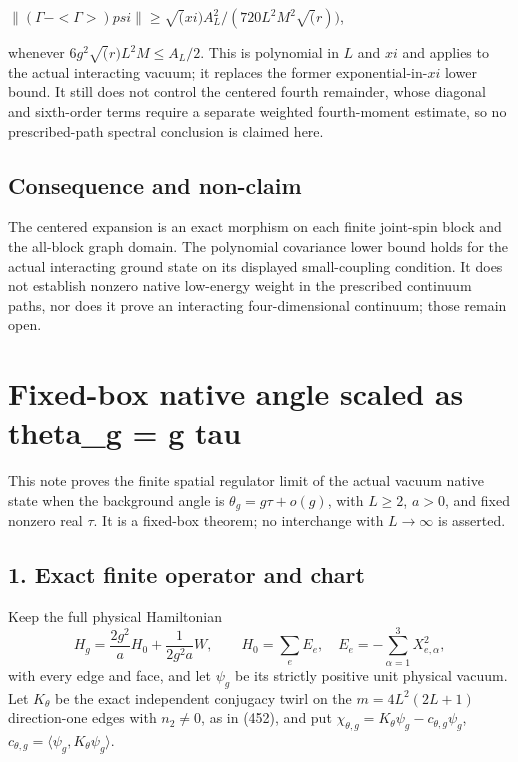 \documentclass[
  11pt,
]{article}
\begin{document}
\(\| (\Gamma-<\Gamma>)psi \| \ge  \sqrt(xi) A_L^2 /(720 L^2 M^2 \sqrt(r))\),

whenever \(6g^2 \sqrt(r)L^2M \le  A_L/2\). This is polynomial in \(L\)
and \(xi\) and applies to the actual interacting vacuum; it replaces the
former exponential-in-\(xi\) lower bound. It still does not control the
centered fourth remainder, whose diagonal and sixth-order terms require
a separate weighted fourth-moment estimate, so no prescribed-path
spectral conclusion is claimed here.

\subsection{Consequence and non-claim}\label{consequence-and-non-claim}

The centered expansion is an exact morphism on each finite joint-spin
block and the all-block graph domain. The polynomial covariance lower
bound holds for the actual interacting ground state on its displayed
small-coupling condition. It does not establish nonzero native
low-energy weight in the prescribed continuum paths, nor does it prove
an interacting four-dimensional continuum; those remain open.

\section{Fixed-box native angle scaled as theta\_g = g
tau}\label{fixed-box-native-angle-scaled-as-theta_g-g-tau}

This note proves the finite spatial regulator limit of the actual vacuum
native state when the background angle is \(\theta_g=g\tau+o(g)\), with
\(L\ge2\), \(a>0\), and fixed nonzero real \(\tau\). It is a fixed-box
theorem; no interchange with \(L\to\infty\) is asserted.

\subsection{1. Exact finite operator and
chart}\label{exact-finite-operator-and-chart}

Keep the full physical Hamiltonian \[
 H_g=\frac{2g^2}{a}H_0+\frac{1}{2g^2a}W,\qquad
 H_0=\sum_eE_e,\quad E_e=-\sum_{\alpha=1}^3X_{e,\alpha}^2,
\] with every edge and face, and let \(\psi_g\) be its strictly positive
unit physical vacuum. Let \(K_\theta\) be the exact independent
conjugacy twirl on the \(m=4L^2(2L+1)\) direction-one edges with
\(n_2\ne0\), as in (452), and put
\(\chi_{\theta,g}=K_\theta\psi_g-c_{\theta,g}\psi_g\),
\(c_{\theta,g}=\langle\psi_g,K_\theta\psi_g\rangle\).
\end{document}
